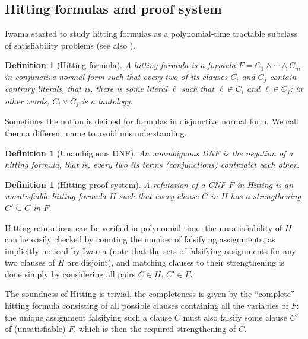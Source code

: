 \documentclass[11pt]{article}
\newcommand{\scterm}[1]{{\textrm{\sc #1}}}
\newcommand{\hit}{\scterm{Hitting}}
\numberwithin{equation}{section}
\newtheorem{definition}[theorem]{Definition}
\begin{document}
\subsection{Hitting formulas and proof system}
Iwama \cite{Iwa89} started to study hitting formulas as a polynomial-time tractable subclass
of satisfiability problems (see also \cite{Kul04}).
\begin{definition}[Hitting formula]\label{def:hitformula}
A \emph{hitting formula} is a formula $F=C_1\land\dotsb\land C_m$ 
in conjunctive normal form such that every two of its clauses $C_i$ and $C_j$
contain contrary literals, that is, there is some literal $\ell$ such that $\ell\in C_i$
and $\bar{\ell}\in C_j$; in other words, $C_i\lor C_j$ is a tautology.
\end{definition}

Sometimes the notion is defined for formulas in disjunctive normal form. 
We call them a different name to avoid misunderstanding.

\begin{definition}[Unambiguous DNF]\label{def:unambiguous-DNF}
An \emph{unambiguous DNF} is the negation of a hitting formula,
that is, every two its terms (conjunctions) contradict each other.
\end{definition}

\begin{definition}[{\hit} proof system]\label{def:hit}
A refutation of a CNF $F$ in {\hit} is an unsatisfiable hitting formula $H$
such that every clause $C$ in $H$ has a strengthening $C'\subseteq C$ in $F$.
\end{definition}

{\hit} refutations can be verified in polynomial time:
the unsatisfiability of $H$ can be easily checked by counting
the number of falsifying assignments, as implicitly noticed by Iwama \cite{Iwa89}
(note that the sets of falsifying assignments
for any two clauses of $H$ are disjoint), and matching clauses
to their strengthening is done simply by considering all pairs $C\in H$, $C'\in F$.

The soundness of {\hit} is trivial, the completeness is given by the ``complete'' 
hitting formula consisting of all possible clauses containing all the variables of $F$:
the unique assignment falsifying such a clause $C$ must also falsify some clause $C'$ of
(unsatisfiable) $F$, which is then the required strengthening of $C$.

\end{document}
